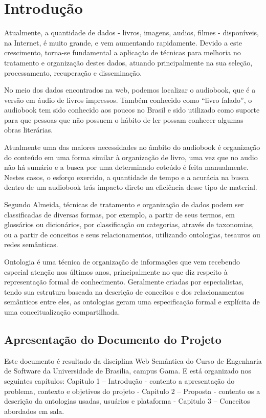 \chapter[Introdução]{Introdução}\label{cap1}
		
Atualmente, a quantidade de dados - livros, imagens, audios, filmes - disponíveis, na Internet, é muito grande, e vem aumentando rapidamente. Devido a este crescimento, torna-se fundamental a aplicação de técnicas para melhoria no tratamento e organização destes dados, atuando principalmente na sua seleção, processamento, recuperação e disseminação.\cite{UVG}

No meio dos dados encontrados na web, podemos localizar o audiobook, que é a versão em áudio de livros impressos. Também conhecido como “livro falado”, o audiobook tem sido conhecido aos poucos no Brasil e sido utilizado como suporte para que pessoas que não possuem o hábito de ler possam conhecer algumas obras literárias.

Atualmente uma das maiores necessidades no âmbito do audiobook é organização do conteúdo em uma forma similar à organização de livro, uma vez que no audio não há sumário e a busca por uma determinado coteúdo é feita manualmente. Nestes casos, o esforço exercido, a quantidade de tempo e a acurácia na busca dentro de um audiobook trás impacto direto na eficiência desse tipo de material.

Segundo Almeida\cite{UVG}, técnicas de tratamento e organização de dados podem ser classificadas de diversas formas, por exemplo, a partir de seus termos, em glossários ou dicionários, por classificação ou categorias, através de taxonomias, ou a partir de conceitos e seus relacionamentos, utilizando ontologias, tesauros ou redes semânticas.\cite{TSW}

Ontologia é uma técnica de organização de informações que vem recebendo especial atenção nos últimos anos, principalmente no que diz respeito à representação formal de conhecimento. Geralmente criadas por especialistas, tendo sua estrutura baseada na descrição de conceitos e dos relacionamentos semânticos entre eles, as ontologias geram uma especificação formal e explícita de uma conceitualização compartilhada.


\section{Apresentação do Documento do Projeto}

Este documento é resultado da disciplina Web Semântica do Curso de Engenharia de Software da Universidade de Brasília, campus Gama. E está organizado nos seguintes capítulos: Capitulo 1 – Introdução - contento a apresentação do problema, contexto e objetivos do projeto -  Capitulo 2 – Proposta - contento os a descrição da ontologias usadas, usuários e plataforma - Capitulo 3 – Conceitos abordados em sala.

